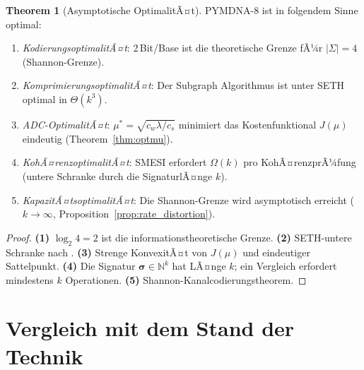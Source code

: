 ﻿\documentclass[a4paper,12pt]{article}
\theoremstyle{definition}
\newtheorem{theorem}{Theorem}[section]
\begin{document}
\begin{theorem}[Asymptotische OptimalitÃ¤t]
  \label{thm:optimalitaet}
  PYMDNA-8 ist in folgendem Sinne optimal:
  \begin{enumerate}[noitemsep]
    \item \emph{KodierungsoptimalitÃ¤t}: 2\,Bit/Base ist die theoretische Grenze
      fÃ¼r $|\Sigma| = 4$ (Shannon-Grenze).
    \item \emph{KomprimierungsoptimalitÃ¤t}: Der Subgraph Algorithmus ist unter
      SETH optimal in $\Theta(k^3)$.
    \item \emph{ADC-OptimalitÃ¤t}: $\mu^* = \sqrt{c_w \lambda / c_s}$ minimiert
      das Kostenfunktional $J(\mu)$ eindeutig (Theorem~\ref{thm:optmu}).
    \item \emph{KohÃ¤renzoptimalitÃ¤t}: SMESI erfordert $\Omega(k)$ pro
      KohÃ¤renzprÃ¼fung (untere Schranke durch die SignaturlÃ¤nge $k$).
    \item \emph{KapazitÃ¤tsoptimalitÃ¤t}: Die Shannon-Grenze wird asymptotisch
      erreicht ($k \to \infty$, Proposition~\ref{prop:rate_distortion}).
  \end{enumerate}
\end{theorem}

\begin{proof}
  \textbf{(1)} $\log_2 4 = 2$ ist die informationstheoretische Grenze.
  \textbf{(2)} SETH-untere Schranke nach \cite{epp2026subgraph}.
  \textbf{(3)} Strenge KonvexitÃ¤t von $J(\mu)$ und eindeutiger Sattelpunkt.
  \textbf{(4)} Die Signatur $\boldsymbol{\sigma} \in \mathbb{N}^k$ hat
  LÃ¤nge $k$; ein Vergleich erfordert mindestens $k$ Operationen.
  \textbf{(5)} Shannon-Kanalcodierungstheorem.
\end{proof}

\section{Vergleich mit dem Stand der Technik}
\end{document}
